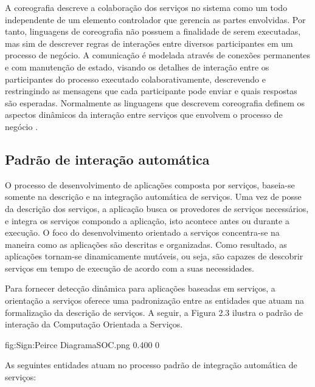 A coreografia descreve a colaboração dos serviços no sistema como um todo  independente de um elemento controlador que gerencia as partes envolvidas. Por tanto, linguagens de coreografia não possuem a finalidade de serem executadas, mas sim de descrever regras de interações entre diversos participantes em um processo de negócio. A comunicação é modelada através de conexões permanentes e com manutenção de estado, visando os detalhes de interação entre os participantes do processo executado colaborativamente, descrevendo e restringindo as mensagens que cada participante pode enviar e quais respostas são esperadas. Normalmente as linguagens que descrevem coreografia definem os aspectos dinâmicos da interação entre serviços que envolvem o processo de negócio \cite{Papazoglou:2006}.

\subsection{Padrão de interação automática}

O processo de desenvolvimento de aplicações composta por serviços, baseia-se somente na descrição e na integração automática de serviços. Uma vez de posse da descrição dos serviços, a aplicação busca os provedores de serviços necessários, e integra os serviços compondo a aplicação, isto acontece antes ou durante a execução. O foco do desenvolvimento orientado a serviços concentra-se na maneira como as aplicações são descritas e organizadas. Como resultado, as aplicações tornam-se dinamicamente mutáveis, ou seja, são capazes de descobrir serviços em tempo de execução de acordo com a suas necessidades.

Para fornecer detecção dinâmica para aplicações baseadas em serviços, a orientação a serviços oferece uma padronização entre as entidades que atuam na formalização da descrição de serviços. A seguir, a Figura 2.3 ilustra o padrão de interação da Computação Orientada a Serviços.


       {fig:Sign:Peirce}
       {DiagramaSOC.png}
       {0.400}
       {0}

As seguintes entidades atuam no processo padrão de integração automática de serviços: 

